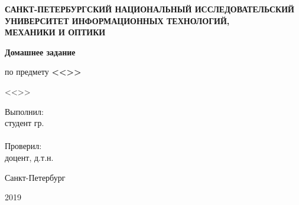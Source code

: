 \thispagestyle{empty}


\begin{center}
\textbf{САНКТ-ПЕТЕРБУРГСКИЙ НАЦИОНАЛЬНЫЙ ИССЛЕДОВАТЕЛЬСКИЙ\\ УНИВЕРСИТЕТ ИНФОРМАЦИОННЫХ ТЕХНОЛОГИЙ, \\МЕХАНИКИ И ОПТИКИ}
\end{center}


\vfill

\begin{center}
	\textbf{Домашнее задание}
	
	по предмету \textbf{<<\Subject>>}
	
	<<\Theme>>
\end{center}

\vfill

\begin{flushright}
	Выполнил:\\
	студент гр. \Group\\
	\FullName\\
	Проверил:\\
	доцент, д.т.н. \Teacher
\end{flushright}

\vfill

\begin{center}
	Санкт-Петербург
	
	2019
\end{center}